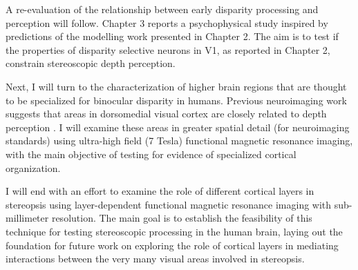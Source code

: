 A re-evaluation of the relationship between early disparity processing and perception will follow. Chapter 3 reports a psychophysical study inspired by predictions of the modelling work presented in Chapter 2. The aim is to test if the properties of disparity selective neurons in V1, as reported in Chapter 2, constrain stereoscopic depth perception.

Next, I will turn to the characterization of higher brain regions that are thought to be specialized for binocular disparity in humans. Previous neuroimaging work suggests that areas in dorsomedial visual cortex are closely related to depth perception \cite{Backus:2001ly,Tsao:2003lk,Preston:2008dg}. I will examine these areas in greater spatial detail (for neuroimaging standards) using ultra-high field (7 Tesla) functional magnetic resonance imaging, with the main objective of testing for evidence of specialized cortical organization.

I will end with an effort to examine the role of different cortical layers in stereopsis using layer-dependent functional magnetic resonance imaging with sub-millimeter resolution. The main goal is to establish the feasibility of this technique for testing stereoscopic processing in the human brain, laying out the foundation for future work on exploring the role of cortical layers in mediating interactions between the very many visual areas involved in stereopsis.



